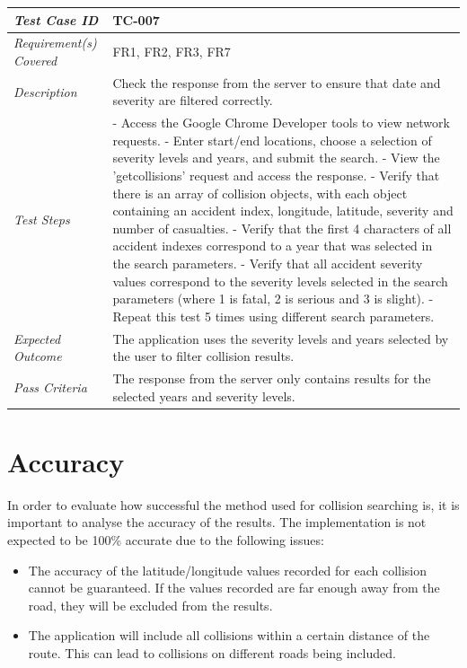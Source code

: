 \documentclass[authoryearcitations]{UoYCSproject}
\begin{document}
\begin{tabular}{| p{2.5cm} | p{11cm} |}
	\hline
	\textit{Test Case ID} & TC-007 \\ \hline
	\textit{Requirement(s) Covered} & FR1, FR2, FR3, FR7 \\ \hline
	\textit{Description} & Check the response from the server to ensure that date and severity are filtered correctly. \\ \hline
	\textit{Test Steps}& - Access the Google Chrome Developer tools to view network requests. 
	\newline - Enter start/end locations, choose a selection of severity levels and years, and submit the search.
	\newline - View the 'getcollisions' request and access the response.
	\newline - Verify that there is an array of collision objects, with each object containing an accident index, longitude, latitude, severity and number of casualties.
	\newline - Verify that the first 4 characters of all accident indexes correspond to a year that was selected in the search parameters.
	\newline - Verify that all accident severity values correspond to the severity levels selected in the search parameters (where 1 is fatal, 2 is serious and 3 is slight).
	\newline - Repeat this test 5 times using different search parameters.
 \\ \hline
	\textit{Expected Outcome} & The application uses the severity levels and years selected by the user to filter collision results.  \\ \hline
	\textit{Pass Criteria} & The response from the server only contains results for the selected years and severity levels. \\ \hline
\end{tabular}

\section{Accuracy}
\label{sec:searchAnalysis}

In order to evaluate how successful the method used for collision searching is, it is important to analyse the accuracy of the results. The implementation is not expected to be 100\% accurate due to the following issues:

\begin{itemize}
	\item The accuracy of the latitude/longitude values recorded for each collision cannot be guaranteed. If the values recorded are far enough away from the road, they will be excluded from the results.
	\item The application will include all collisions within a certain distance of the route. This can lead to collisions on different roads being included.
\end{itemize}
\end{document}
